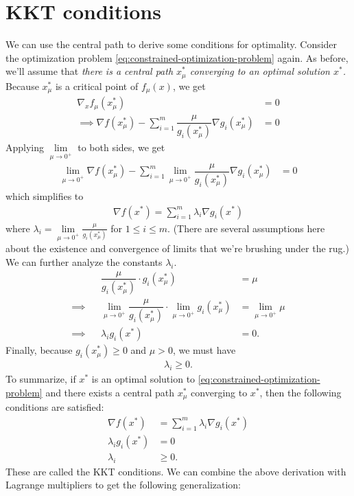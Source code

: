 \documentclass[
]{book}
\theoremstyle{definition}
\theoremstyle{definition}
\theoremstyle{definition}
\theoremstyle{definition}
\theoremstyle{remark}
\begin{document}
\hypertarget{kkt-conditions}{%
\chapter{KKT conditions}\label{kkt-conditions}}

We can use the central path to derive some conditions for optimality.
Consider the optimization problem \eqref{eq:constrained-optimization-problem} again.
As before, we'll assume that \emph{there is a central path \(x_\mu^*\) converging to an optimal solution \(x^*\).}
Because \(x_\mu^*\) is a critical point of \(f_\mu(x)\), we get
\begin{align*}
  \nabla_x f_\mu(x_\mu^*) &= 0 \\
  \implies \nabla f(x_\mu^*) - \sum \limits_{i = 1}^m \dfrac{\mu}{g_i(x_\mu^*)} \nabla g_i (x_\mu^*)&= 0 
\end{align*}
Applying \(\lim \limits_{\mu \to 0^+}\) to both sides, we get
\begin{align*}
   \lim \limits_{\mu \to 0^+} \nabla f(x_\mu^*) - \sum \limits_{i = 1}^m \lim \limits_{\mu \to 0^+}\dfrac{\mu}{g_i(x_\mu^*)} \nabla g_i (x_\mu^*)&= 0 
\end{align*}
which simplifies to
\begin{align*}
  \nabla f(x^*) = \sum \limits_{i = 1}^m \lambda_i \nabla g_i (x^*) 
\end{align*}
where \(\lambda_i = \lim \limits_{\mu \to 0^+}\frac{\mu}{g_i(x_\mu^*)}\) for \(1 \le i \le m\). (There are several assumptions here about the existence and convergence of limits that we're brushing under the rug.)
We can further analyze the constants \(\lambda_i\).
\begin{align*}
  && \dfrac{\mu}{g_i(x_\mu^*)} \cdot g_i(x_\mu^*) &= \mu \\ 
  \implies && \lim \limits_{\mu \to 0^+}\dfrac{\mu}{g_i(x_\mu^*)} \cdot \lim \limits_{\mu \to 0^+}g_i(x_\mu^*) &= \lim \limits_{\mu \to 0^+}\mu \\ 
  \implies &&\lambda_i g_i(x^*) &= 0.
\end{align*}
Finally, because \(g_i(x_\mu^*) \ge 0\) and \(\mu > 0\), we must have
\begin{align*}
  \lambda_i \ge 0.
\end{align*}
To summarize, if \(x^*\) is an optimal solution to \eqref{eq:constrained-optimization-problem} and there exists a central path \(x_\mu^*\) converging to \(x^*\), then the following conditions are satisfied:
\begin{align*}
  \nabla f(x^*) &= \sum \limits_{i = 1}^m \lambda_i \nabla g_i (x^*) \\
  \lambda_i g_i(x^*) &= 0 \\
  \lambda_i &\ge 0.
\end{align*}
These are called the KKT conditions.
We can combine the above derivation with Lagrange multipliers to get the following generalization:
\end{document}
